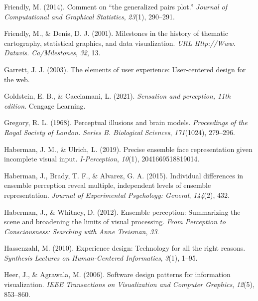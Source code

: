 \documentclass[print]{nuthesis}
\newlength{\cslhangindent}
\newenvironment{CSLReferences}[2]%
{\setlength{\parindent}{0pt}%
\everypar{\setlength{\hangindent}{\cslhangindent}}\ignorespaces}%
{\par}
\begin{document}
\begin{CSLReferences}{1}{0}
\leavevmode{}%
Friendly, M. (2014). Comment on {``the generalized pairs plot.''} \emph{Journal of Computational and Graphical Statistics}, \emph{23}(1), 290--291.

\leavevmode{}%
Friendly, M., \& Denis, D. J. (2001). Milestones in the history of thematic cartography, statistical graphics, and data visualization. \emph{URL Http://Www. Datavis. Ca/Milestones}, \emph{32}, 13.

\leavevmode{}%
Garrett, J. J. (2003). The elements of user experience: User-centered design for the web.

\leavevmode{}%
Goldstein, E. B., \& Cacciamani, L. (2021). \emph{Sensation and perception, 11th edition}. Cengage Learning.

\leavevmode{}%
Gregory, R. L. (1968). Perceptual illusions and brain models. \emph{Proceedings of the Royal Society of London. Series B. Biological Sciences}, \emph{171}(1024), 279--296.

\leavevmode{}%
Haberman, J. M., \& Ulrich, L. (2019). Precise ensemble face representation given incomplete visual input. \emph{I-Perception}, \emph{10}(1), 2041669518819014.

\leavevmode{}%
Haberman, J., Brady, T. F., \& Alvarez, G. A. (2015). Individual differences in ensemble perception reveal multiple, independent levels of ensemble representation. \emph{Journal of Experimental Psychology: General}, \emph{144}(2), 432.

\leavevmode{}%
Haberman, J., \& Whitney, D. (2012). Ensemble perception: Summarizing the scene and broadening the limits of visual processing. \emph{From Perception to Consciousness: Searching with Anne Treisman}, \emph{33}.

\leavevmode{}%
Hassenzahl, M. (2010). Experience design: Technology for all the right reasons. \emph{Synthesis Lectures on Human-Centered Informatics}, \emph{3}(1), 1--95.

\leavevmode{}%
Heer, J., \& Agrawala, M. (2006). Software design patterns for information visualization. \emph{IEEE Transactions on Visualization and Computer Graphics}, \emph{12}(5), 853--860.


\end{CSLReferences}
\end{document}
